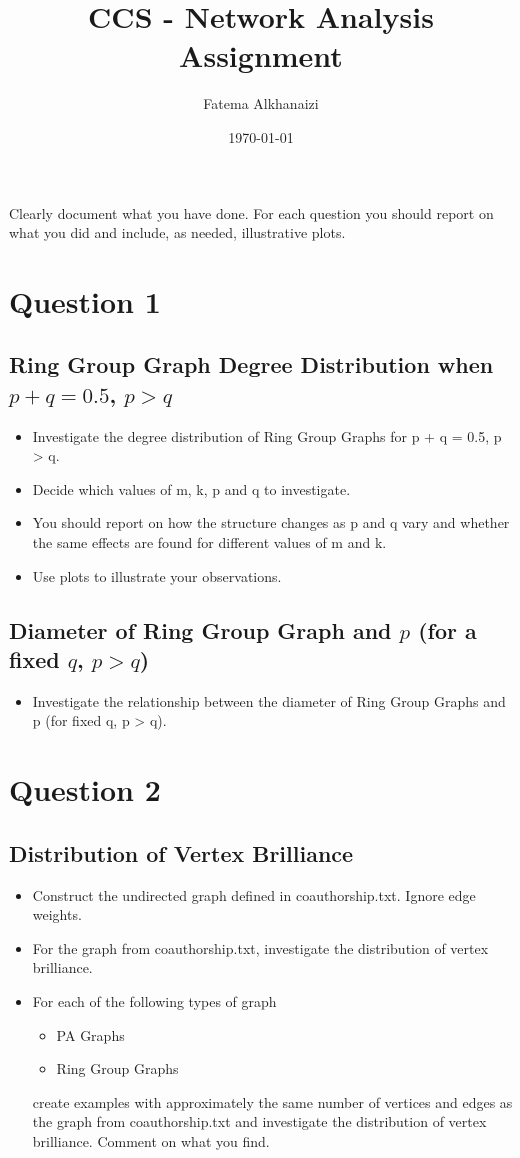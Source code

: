 \documentclass[11pt,a4paper,notitlepage]{article}
\title{CCS - Network Analysis Assignment}
\author{Fatema Alkhanaizi}
\date{\today}
\begin{document}
\maketitle

\noindent
Clearly document what you have done. For each question you should report on what you did and include, as needed, illustrative plots.

\section*{Question 1}
\subsection*{Ring Group Graph Degree Distribution when $p + q = 0.5$, $p > q$}
\begin{itemize}
    \item Investigate the degree distribution of Ring Group Graphs for p + q = 0.5, p > q. 
    \item Decide which values of m, k, p and q to investigate. 
    \item You should report on how the structure changes as p and q vary and whether the same effects are found for different values of m and k.
    \item Use plots to illustrate your observations.
\end{itemize}

 
\subsection*{Diameter of Ring Group Graph and $p$ (for a fixed $q$, $p > q$)}
\begin{itemize}
    \item Investigate the relationship between the diameter of Ring Group Graphs and p (for fixed q, p > q). 
\end{itemize}

\section*{Question 2}
\subsection*{Distribution of Vertex Brilliance}
\begin{itemize}
    \item Construct the undirected graph defined in coauthorship.txt. Ignore edge weights.
    \item For the graph from coauthorship.txt, investigate the distribution of vertex brilliance. 
    \item For each of the following types of graph
    \begin{itemize}
    \item PA Graphs
    \item Ring Group Graphs 
    \end{itemize}
    create examples with approximately the same number of vertices and edges as the graph from coauthorship.txt and investigate the distribution of vertex brilliance. Comment on what you find.
\end{itemize}
\end{document}
